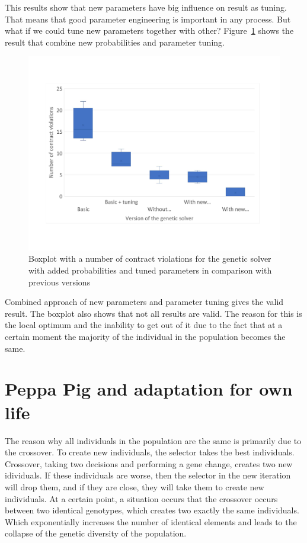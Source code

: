 This results show that new parameters have big influence on result as tuning. That means that good parameter engineering is important in any process.  But what if we could tune new parameters together with other?
Figure~\ref{fig:boxplotsolverNewParametersTuning} shows the result that combine new probabilities and parameter tuning.
\begin{figure}
	\centering
	\includegraphics[width=\textwidth]{images/BoxPlotSolverNewParametersTuning.pdf}
	\caption[Boxplot with a number of contract violations for the genetic solver with added probabilities and tuned parameters in comparison with previous versions]{Boxplot with a number of contract violations for the genetic solver with added probabilities and tuned parameters in comparison with previous versions}
	\label{fig:boxplotsolverNewParametersTuning}
\end{figure}

Combined approach of new parameters and parameter tuning gives the valid result. The boxplot also shows that not all results are valid. The reason for this is the local optimum and the inability to get out of it due to the fact that at a certain moment the majority of the individual in the population becomes the same. 

\section{Peppa Pig and adaptation for own life}
The reason why all individuals in the population are the same is primarily due to the crossover. To create new individuals, the selector takes the best individuals. Crossover, taking two decisions and performing a gene change, creates two new idividuals. If these individuals are worse, then the selector in the new iteration will drop them, and if they are close, they will take them to create new individuals. At a certain point, a situation occurs that the crossover occurs between two identical genotypes, which creates two exactly the same individuals. Which exponentially increases the number of identical elements and leads to the collapse of the genetic diversity of the population.

